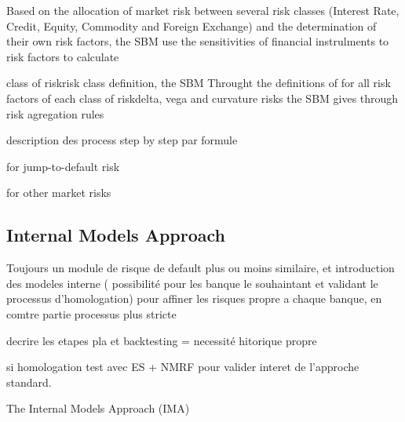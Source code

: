 \documentclass[3pt]{article}
\begin{document}
\bigskip 

Based on the allocation of market risk between several risk classes
(Interest Rate, Credit, Equity, Commodity and Foreign Exchange) and the
determination of their own risk factors, the SBM use the sensitivities of
financial instrulments to risk factors to calculate

\bigskip 

\bigskip 

\bigskip 

\bigskip 

\bigskip 

\bigskip 

\bigskip 

\bigskip 

class of riskrisk class definition, the SBM Throught the definitions of for
all risk factors of each class of riskdelta, vega and curvature risks the
SBM gives through risk agregation rules 

\bigskip 

description des process step by step par formule

\bigskip 

\bigskip 

\bigskip 

\bigskip 

\bigskip 

for jump-to-default risk

for other market risks 

\bigskip 

\subsection{Internal Models Approach}

\bigskip 

Toujours un module de risque de default plus ou moins similaire, et
introduction des modeles interne ( possibilit\'{e} pour les banque le
souhaintant et validant le processus d'homologation) pour affiner les
risques propre a chaque banque, en comtre partie processus plus
stricte\bigskip 

\bigskip 

decrire les etapes pla et backtesting =\TEXTsymbol{>} necessit\'{e}
hitorique propre

si homologation test avec ES + NMRF pour valider interet de l'approche
standard.

\bigskip 

The Internal Models Approach (IMA)
\end{document}
